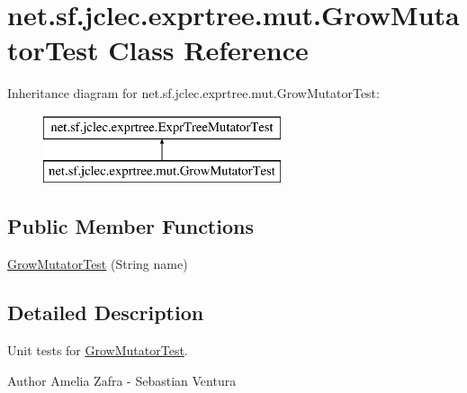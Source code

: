 \hypertarget{classnet_1_1sf_1_1jclec_1_1exprtree_1_1mut_1_1_grow_mutator_test}{\section{net.\-sf.\-jclec.\-exprtree.\-mut.\-Grow\-Mutator\-Test Class Reference}
\label{classnet_1_1sf_1_1jclec_1_1exprtree_1_1mut_1_1_grow_mutator_test}
}
Inheritance diagram for net.\-sf.\-jclec.\-exprtree.\-mut.\-Grow\-Mutator\-Test\-:\begin{figure}[H]
\begin{center}
\leavevmode
\includegraphics[height=2.000000cm]{classnet_1_1sf_1_1jclec_1_1exprtree_1_1mut_1_1_grow_mutator_test}
\end{center}
\end{figure}
\subsection*{Public Member Functions}
\begin{DoxyCompactItemize}
\item 
\hyperlink{classnet_1_1sf_1_1jclec_1_1exprtree_1_1mut_1_1_grow_mutator_test_abf093663ae3ec2d892a8981956356a8f}{Grow\-Mutator\-Test} (String name)
\end{DoxyCompactItemize}


\subsection{Detailed Description}
Unit tests for \hyperlink{classnet_1_1sf_1_1jclec_1_1exprtree_1_1mut_1_1_grow_mutator_test}{Grow\-Mutator\-Test}.

\begin{DoxyAuthor}{Author}
Amelia Zafra -\/ Sebastian Ventura 
\end{DoxyAuthor}


